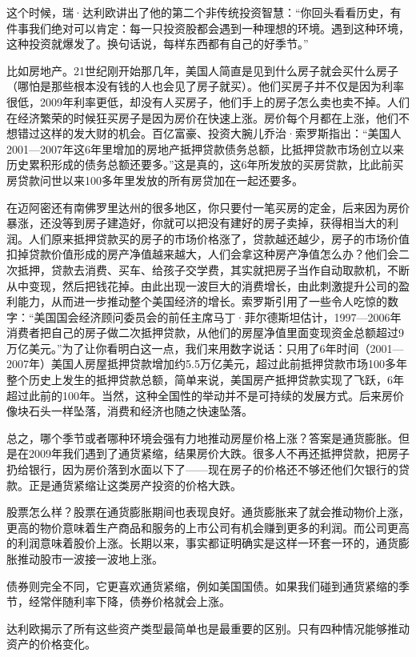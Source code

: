这个时候，瑞·达利欧讲出了他的第二个非传统投资智慧：“你回头看看历史，有件事我们绝对可以肯定：每一只投资股都会遇到一种理想的环境。遇到这种环境，这种投资就爆发了。换句话说，每样东西都有自己的好季节。”

比如房地产。21世纪刚开始那几年，美国人简直是见到什么房子就会买什么房子（哪怕是那些根本没有钱的人也会见了房子就买）。他们买房子并不仅是因为利率很低，2009年利率更低，却没有人买房子，他们手上的房子怎么卖也卖不掉。人们在经济繁荣的时候狂买房子是因为房价在快速上涨。房价每个月都在上涨，他们不想错过这样的发大财的机会。百亿富豪、投资大腕儿乔治·索罗斯指出：“美国人2001—2007年这6年里增加的房地产抵押贷款债务总额，比抵押贷款市场创立以来历史累积形成的债务总额还要多。”这是真的，这6年所发放的买房贷款，比此前买房贷款问世以来100多年里发放的所有房贷加在一起还要多。

在迈阿密还有南佛罗里达州的很多地区，你只要付一笔买房的定金，后来因为房价暴涨，还没等到房子建造好，你就可以把没有建好的房子卖掉，获得相当大的利润。人们原来抵押贷款买的房子的市场价格涨了，贷款越还越少，房子的市场价值扣掉贷款价值形成的房产净值越来越大，人们会拿这种房产净值怎么办？他们会二次抵押，贷款去消费、买车、给孩子交学费，其实就把房子当作自动取款机，不断从中变现，然后把钱花掉。由此出现一波巨大的消费增长，由此刺激提升公司的盈利能力，从而进一步推动整个美国经济的增长。索罗斯引用了一些令人吃惊的数字：“美国国会经济顾问委员会的前任主席马丁·菲尔德斯坦估计，1997—2006年消费者把自己的房子做二次抵押贷款，从他们的房屋净值里面变现资金总额超过9万亿美元。”为了让你看明白这一点，我们来用数字说话：只用了6年时间（2001—2007年）美国人房屋抵押贷款增加约5.5万亿美元，超过此前抵押贷款市场100多年整个历史上发生的抵押贷款总额，简单来说，美国房产抵押贷款实现了飞跃，6年超过此前的100年。当然，这种全国性的举动并不是可持续的发展方式。后来房价像块石头一样坠落，消费和经济也随之快速坠落。

总之，哪个季节或者哪种环境会强有力地推动房屋价格上涨？答案是通货膨胀。但是在2009年我们遇到了通货紧缩，结果房价大跌。很多人不再还抵押贷款，把房子扔给银行，因为房价落到水面以下了——现在房子的价格还不够还他们欠银行的贷款。正是通货紧缩让这类房产投资的价格大跌。

股票怎么样？股票在通货膨胀期间也表现良好。通货膨胀来了就会推动物价上涨，更高的物价意味着生产商品和服务的上市公司有机会赚到更多的利润。而公司更高的利润意味着股价上涨。长期以来，事实都证明确实是这样一环套一环的，通货膨胀推动股市一波接一波地上涨。

债券则完全不同，它更喜欢通货紧缩，例如美国国债。如果我们碰到通货紧缩的季节，经常伴随利率下降，债券价格就会上涨。

达利欧揭示了所有这些资产类型最简单也是最重要的区别。只有四种情况能够推动资产的价格变化。

